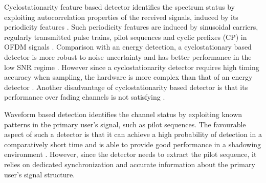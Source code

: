 Cyclostationarity feature based detector identifies the spectrum status by exploiting autocorrelation properties of the received signals, induced by its periodicity features \cite{goldsmith2009breaking}. Such periodicity features are induced by  sinusoidal carriers,  regularly transmitted pulse trains, pilot sequences and cyclic prefixes (CP) in OFDM signals \cite{akyildiz2011cooperative, umar2013comparative}.  
Comparison with an energy detection, a cyclostationary based detector is more robust to noise uncertainty and has better performance in the low SNR regime \cite{umar2013comparative}. However since a cyclostationarity detector requires high timing accuracy when sampling, the hardware is more complex than that of an energy detector \cite{yucek2009survey}. Another disadvantage of cyclostationarity based detector is that its performance over fading channels is not satisfying \cite{tandra2007snr}.   

Waveform based detection identifies the channel status by exploiting known patterns in the primary user's signal, such as pilot sequences. The favourable aspect of such a detector is that it can achieve a high probability of detection in a comparatively short time and is able to provide  good performance in a shadowing environment \cite{tang2005some}. However, since the detector needs to extract the pilot sequence, it relies on dedicated synchronization and accurate information about the primary user's signal structure.  



